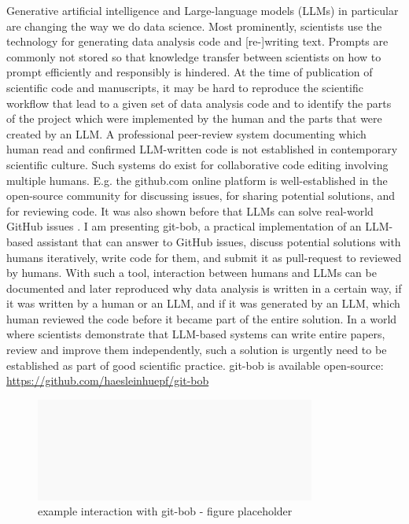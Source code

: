 \documentclass{ecai}
\begin{document}
Generative artificial intelligence and Large-language models (LLMs) in particular are changing the way we do data science. Most prominently, scientists use the technology for generating data analysis code \citep{Royer2023, royer2023omega} and [re-]writing text. Prompts are commonly not stored so that knowledge transfer between scientists on how to prompt efficiently and responsibly is hindered. At the time of publication of scientific code and manuscripts, it may be hard to reproduce the scientific workflow that lead to a given set of data analysis code and to identify the parts of the project which were implemented by the human and the parts that were created by an LLM. A professional peer-review system documenting which human read and confirmed LLM-written code is not established in contemporary scientific culture. Such systems do exist for collaborative code editing involving multiple humans. E.g. the github.com online platform is well-established in the open-source community for discussing issues, for sharing potential solutions, and for reviewing code. It was also shown before that LLMs can solve real-world GitHub issues \citep{jimenez2024swebenchlanguagemodelsresolve}. I am presenting git-bob, a practical implementation of an LLM-based assistant that can answer to GitHub issues, discuss potential solutions with humans iteratively, write code for them, and submit it as pull-request to reviewed by humans. With such a tool, interaction between humans and LLMs can be documented and later reproduced why data analysis is written in a certain way, if it was written by a human or an LLM, and if it was generated by an LLM, which human reviewed the code before it became part of the entire solution. In a world where scientists demonstrate that LLM-based systems can write entire papers, review and improve them \citep{lu2024aiscientist} independently, such a solution is urgently need to be established as part of good scientific practice. git-bob is available open-source: \url{https://github.com/haesleinhuepf/git-bob}

\begin{figure}[h]
\centering
\includegraphics[width=0.82\textwidth]{fig1_example_interaction.png}
\caption{example interaction with git-bob - figure placeholder
\newline
\newline
}
\label{fig:exampleinteraction}
\end{figure}
\end{document}
